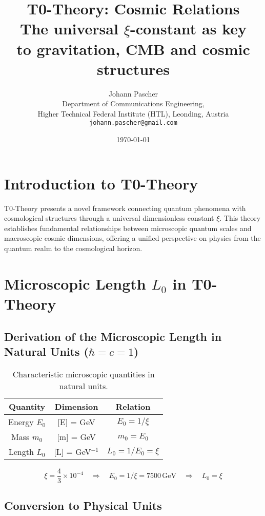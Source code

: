 \documentclass[12pt,a4paper]{article}
\title{\Huge\textbf{T0-Theory: Cosmic Relations}\\
	\Large The universal $\xi$-constant as key \\ to gravitation, CMB and cosmic structures}
\author{\Large Johann Pascher\\
	Department of Communications Engineering,\\
	Higher Technical Federal Institute (HTL), Leonding, Austria\\
	\texttt{johann.pascher@gmail.com}}
\date{\today}
\numberwithin{equation}{section}
\begin{document}
	
	\maketitle
	\thispagestyle{fancy}
	
	\tableofcontents
	
	\section{Introduction to T0-Theory}
	
	T0-Theory presents a novel framework connecting quantum phenomena with cosmological structures through a universal dimensionless constant $\xi$. This theory establishes fundamental relationships between microscopic quantum scales and macroscopic cosmic dimensions, offering a unified perspective on physics from the quantum realm to the cosmological horizon.
	
	\section{Microscopic Length $L_0$ in T0-Theory}
	
	\subsection{Derivation of the Microscopic Length in Natural Units ($\hbar = c = 1$)}
	
	\begin{table}[h!]
		\centering
		\begin{tabular}{ccc}
			\toprule
			\textbf{Quantity} & \textbf{Dimension} & \textbf{Relation} \\
			\midrule
			Energy $E_0$ & [E] = GeV & $E_0 = 1/\xi$ \\
			Mass $m_0$ & [m] = GeV & $m_0 = E_0$ \\
			Length $L_0$ & [L] = GeV$^{-1}$ & $L_0 = 1/E_0 = \xi$ \\
			\bottomrule
		\end{tabular}
		\caption{Characteristic microscopic quantities in natural units.}
	\end{table}
	
	\[
	\xi = \frac{4}{3} \times 10^{-4} \quad \Rightarrow \quad E_0 = 1/\xi = 7500 \,\text{GeV} \quad \Rightarrow \quad L_0 = \xi
	\]
	
	\subsection{Conversion to Physical Units}
	
\end{document}

